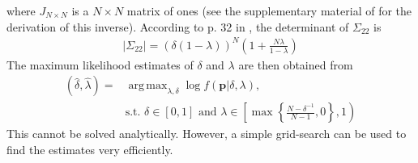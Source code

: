 \documentclass[11pt]{article}
\DeclareMathOperator*{\argmax}{arg\,max}
\theoremstyle{definition}
\theoremstyle{definition}
\begin{document}
where $J_{N \times N}$ is a $N\times N$ matrix of ones (see the supplementary material of \cite{dobbin2005sample} for the derivation of this inverse).  According to p. 32 in \cite{rao2009linear}, the determinant of $\Sigma_{22}$ is
\begin{align*}
\left| \Sigma_{22}\right| = (\delta(1- \lambda))^N \left(1+\frac{N \lambda}{1 - \lambda} \right)
\end{align*}
The maximum likelihood estimates of $\delta$ and $\lambda$ are then obtained from
\begin{align*}
\left(\hat{\delta}, \hat{\lambda}\right) =& \argmax_{\lambda, \delta} \log  f\left(\boldsymbol{p}| \delta, \lambda \right),\\
& \text{s.t. } \nonumber \delta \in [0,1] \text{ and } \lambda \in \left[  \max \left\{ \frac{N-\delta^{-1}}{N-1}, 0\right\}, 1 \right)
\end{align*}
This  cannot be solved analytically. However, a simple grid-search can be used to find the estimates very efficiently. 







\end{document}
